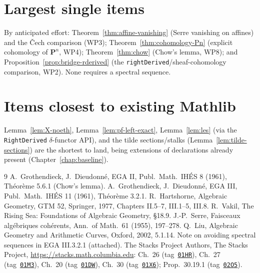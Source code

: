 \documentclass[11pt]{report}
\theoremstyle{plain}
\theoremstyle{definition}
\newcommand{\PP}{\mathbf{P}}
\newcommand{\stacks}[1]{\href{https://stacks.math.columbia.edu/tag/#1}{\texttt{#1}}}
\begin{document}
\section{Largest single items}
By anticipated effort: Theorem~\ref{thm:affine-vanishing} (Serre vanishing on
affines) and the \v{C}ech comparison (WP3); Theorem~\ref{thm:cohomology-Pn}
(explicit cohomology of $\PP^n$, WP4); Theorem~\ref{thm:chow} (Chow's lemma,
WP8); and Proposition~\ref{prop:bridge-rderived} (the
\texttt{rightDerived}/sheaf-cohomology comparison, WP2). None requires a
spectral sequence.

\section{Items closest to existing Mathlib}
Lemma~\ref{lem:X-noeth}, Lemma~\ref{lem:pf-left-exact}, Lemma~\ref{lem:les}
(via the \texttt{RightDerived} $\delta$-functor API), and the tilde
sections/stalks (Lemma~\ref{lem:tilde-sections}) are the shortest to land,
being extensions of declarations already present
(Chapter~\ref{chap:baseline}).

\begin{thebibliography}{9}
 A.~Grothendieck, J.~Dieudonn\'e, EGA II, Publ.\ Math.\ IH\'ES 8
(1961), Th\'eor\`eme 5.6.1 (Chow's lemma).
 A.~Grothendieck, J.~Dieudonn\'e, EGA III, Publ.\ Math.\ IH\'ES 11
(1961), Th\'eor\`eme 3.2.1.
 R.~Hartshorne, Algebraic Geometry, GTM 52, Springer, 1977,
Chapters II.5--7, III.1--5, III.8.
 R.~Vakil, The Rising Sea: Foundations of Algebraic Geometry,
\S18.9.
 J.-P.~Serre, Faisceaux alg\'ebriques coh\'erents, Ann.\ of
Math.\ 61 (1955), 197--278.
 Q.~Liu, Algebraic Geometry and Arithmetic Curves, Oxford, 2002,
5.1.14.
 Note on avoiding spectral sequences in EGA III.3.2.1 (attached).
 The Stacks Project Authors, The Stacks Project,
\url{https://stacks.math.columbia.edu}: Ch.~26 (tag~\stacks{01HR}), Ch.~27
(tag~\stacks{01M3}), Ch.~20 (tag~\stacks{01DW}), Ch.~30 (tag~\stacks{01X6});
Prop.~30.19.1 (tag~\stacks{02O5}).
\end{thebibliography}
\end{document}

